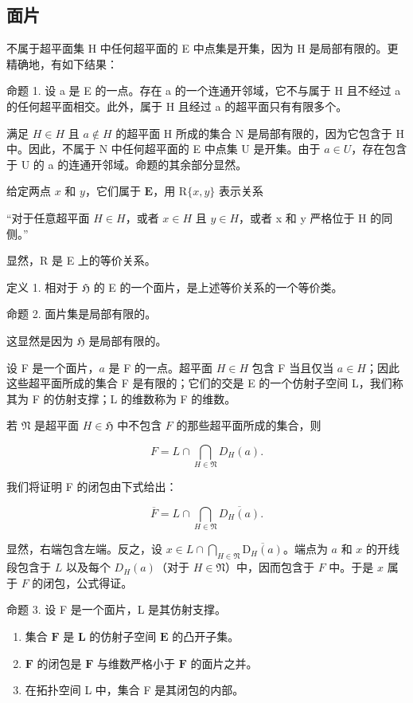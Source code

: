 \subsection{面片}

不属于超平面集 H 中任何超平面的 E 中点集是开集，因为 H 是局部有限的。更精确地，有如下结果：

命题 1. 设 a 是 E 的一点。存在 a 的一个连通开邻域，它不与属于 H 且不经过 a 的任何超平面相交。此外，属于 H 且经过 a 的超平面只有有限多个。

满足 \(H \in H\) 且 \(a \notin H\) 的超平面 H 所成的集合 N 是局部有限的，因为它包含于 H 中。因此，不属于 N 中任何超平面的 E 中点集 U 是开集。由于 \(a \in U\)，存在包含于 U 的 a 的连通开邻域。命题的其余部分显然。

给定两点 \(x\) 和 \(y\)，它们属于 \(\mathbf{E}\)，用 \(\mathrm{R}\{x,y\}\) 表示关系

“对于任意超平面 \(H \in H\)，或者 \(x \in H\) 且 \(y \in H\)，或者 x 和 y 严格位于 H 的同侧。”

显然，R 是 E 上的等价关系。

定义 1. 相对于 \(\mathfrak{H}\) 的 E 的一个面片，是上述等价关系的一个等价类。

命题 2. 面片集是局部有限的。

这显然是因为 \(\mathfrak{H}\) 是局部有限的。

设 F 是一个面片，\(a\) 是 F 的一点。超平面 \(H \in H\) 包含 F 当且仅当 \(a \in H\)；因此这些超平面所成的集合 F 是有限的；它们的交是 E 的一个仿射子空间 L，我们称其为 F 的仿射支撑；L 的维数称为 F 的维数。

若 \(\mathfrak{N}\) 是超平面 \(H\in \mathfrak{H}\) 中不包含 \(F\) 的那些超平面所成的集合，则

\[
F = L \cap \bigcap_ {H \in \mathfrak {N}} D _ {H} (a).\tag{2}
\]

我们将证明 F 的闭包由下式给出：

\[
\overline {{F}} = L \cap \bigcap_ {H \in \mathfrak {N}} \overline {{D _ {H} (a)}}.\tag{3}
\]

显然，右端包含左端。反之，设 \(x \in L \cap \bigcap_{H \in \mathfrak{N}} \overline{\mathrm{D}_H(a)}\)。端点为 \(a\) 和 \(x\) 的开线段包含于 \(L\) 以及每个 \(D_H(a)\)（对于 \(H \in \mathfrak{N}\)）中，因而包含于 \(F\) 中。于是 \(x\) 属于 \(F\) 的闭包，公式得证。

命题 3. 设 F 是一个面片，L 是其仿射支撑。

\begin{enumerate}
\def\labelenumi{(\roman{enumi})}
\item
  集合 \(\mathbf{F}\) 是 \(\mathbf{L}\) 的仿射子空间 \(\mathbf{E}\) 的凸开子集。
\item
  \(\mathbf{F}\) 的闭包是 \(\mathbf{F}\) 与维数严格小于 \(\mathbf{F}\) 的面片之并。
\item
  在拓扑空间 L 中，集合 F 是其闭包的内部。
\end{enumerate}

